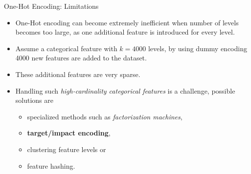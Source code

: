 \begin{vbframe}{One-Hot Encoding: Limitations}

\begin{itemize}
\item One-Hot encoding can become extremely inefficient when number of levels becomes too large, as one additional feature is introduced for every level.

\item Assume a categorical feature with $k=4000$ levels, by using dummy encoding 4000 new features are added to the dataset.

\item These additional features are very sparse.

\item Handling such \textit{high-cardinality categorical features} is a challenge, possible solutions are
    \begin{itemize}
    \item specialized methods such as \textit{factorization machines},
    \item \textbf{target/impact encoding},
    \item clustering feature levels or
    \item feature hashing.
    \end{itemize}
\end{itemize}

\end{vbframe}

\endlecture

